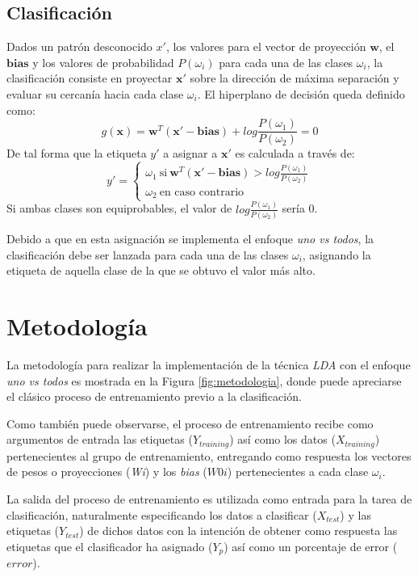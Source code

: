 \documentclass[journal]{IEEEtran}
\begin{document}
\subsection{Clasificación} %
\label{sub:clasificacion}
Dados un patrón desconocido $x'$, los valores para el vector de proyección $\mathbf{w}$, el $\mathbf{bias}$ y los valores de probabilidad $P(\omega_i)$ para cada una de las clases $\omega_i$, la clasificación consiste en proyectar $\mathbf{x'}$ sobre la dirección de máxima separación y evaluar su cercanía hacia cada clase $\omega_i$.
El hiperplano de decisión queda definido como:
\begin{equation}
g(\mathbf{x}) = \mathbf{w}^T (\mathbf{x'} - \mathbf{bias}) + log\frac{P(\omega_1)}{P(\omega_2)} = 0
\end{equation}
De tal forma que la etiqueta $y'$ a asignar a $\mathbf{x'}$ es calculada a través de:
\begin{equation}
y'=\left\{\begin{matrix}
\omega_1~\text{si}~\mathbf{w}^T (\mathbf{x'} - \mathbf{bias}) > log\frac{P(\omega_1)}{P(\omega_2)} \\
\omega_2~\text{en caso contrario}
\end{matrix}\right.
\end{equation}
Si ambas clases son equiprobables, el valor de $log\frac{P(\omega_1)}{P(\omega_2)}$ sería 0.

Debido a que en esta asignación se implementa el enfoque \emph{uno vs todos}, la clasificación debe ser lanzada para cada una de las clases $\omega_i$, asignando la etiqueta de aquella clase de la que se obtuvo el valor más alto.

\section{Metodología}
\label{sec:metodologia}
La metodología para realizar la implementación de la técnica \emph{LDA} con el enfoque \emph{uno vs todos} es mostrada en la Figura \ref{fig:metodologia}, donde puede apreciarse el clásico proceso de entrenamiento previo a la clasificación.

Como también puede observarse, el proceso de entrenamiento recibe como argumentos de entrada las etiquetas ($Y_{training}$) así como los datos ($X_{training}$) pertenecientes al grupo de entrenamiento, entregando como respuesta los vectores de pesos o proyecciones (\emph{Wi}) y los \emph{bias} ($W0i$) pertenecientes a cada clase $\omega_i$.

La salida del proceso de entrenamiento es utilizada como entrada para la tarea de clasificación, naturalmente especificando los datos a clasificar ($X_{test}$) y las etiquetas ($Y_{test}$) de dichos datos con la intención de obtener como respuesta las etiquetas que el clasificador ha asignado ($Y_p$) así como un porcentaje de error ($error$).
\end{document}
